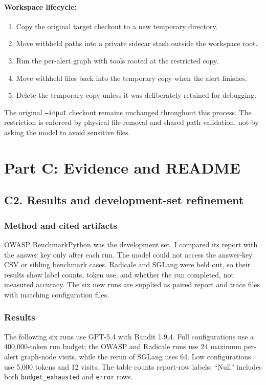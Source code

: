 \documentclass[11pt]{article}
\begin{document}
\paragraph{Workspace lifecycle:}
\begin{enumerate}
  \item Copy the original target checkout to a new temporary directory.
  \item Move withheld paths into a private sidecar stash outside the workspace root.
  \item Run the per-alert graph with tools rooted at the restricted copy.
  \item Move withheld files back into the temporary copy when the alert finishes.
  \item Delete the temporary copy unless it was deliberately retained for debugging.
\end{enumerate}
The original \texttt{--input} checkout remains unchanged throughout this process. The restriction is enforced by physical file removal and shared path validation, not by asking the model to avoid sensitive files.

\clearpage
\section*{Part C: Evidence and README}
\subsection*{C2. Results and development-set refinement}

\subsubsection*{Method and cited artifacts}
OWASP BenchmarkPython was the development set. I compared its report with the answer key only after each run. The model could not access the answer-key CSV or sibling benchmark cases. Radicale and SGLang were held out, so their results show label counts, token use, and whether the run completed, not measured accuracy. The six new runs are supplied as paired report and trace files with matching configuration files.

\subsubsection*{Results}
The following six runs use GPT-5.4 with Bandit 1.9.4. Full configurations use a 400,000-token run budget; the OWASP and Radicale runs use 24 maximum per-alert graph-node visits, while the rerun of SGLang uses 64. Low configurations use 5,000 tokens and 12 visits. The table counts report-row labels; ``Null'' includes both \texttt{budget\_exhausted} and \texttt{error} rows.
\end{document}
